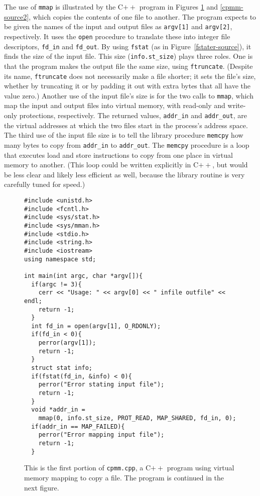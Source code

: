 The use of \verb|mmap| is illustrated by the C$++$ program in
Figures \ref{cpmm-source1} and \ref{cpmm-source2}, which copies the contents of one file to
another.  The program expects to be given the names of the input and
output files as \verb|argv[1]| and \verb|argv[2]|, respectively.  It
uses the \verb|open| procedure to translate these into integer file
descriptors, \verb|fd_in| and \verb|fd_out|.  By using \verb|fstat|
(as in Figure~\ref{fstater-source}), it finds the size of the input
file.  This size (\verb|info.st_size|) plays three roles.  One is that
the program makes the output file the same size, using
\verb|ftruncate|.  (Despite its name,
\verb|ftruncate| does not necessarily make a file shorter; it sets the
file's size, whether by truncating it or by padding it out with extra
bytes that all have the value zero.)  Another use of the input file's size is for the two calls to
\verb|mmap|, which map the input and output files into virtual memory,
with read-only and write-only protections, respectively.  The returned
values, \verb|addr_in| and \verb|addr_out|, are the virtual addresses
at which the two files start in the process's address space.  The
third use of the input file size is to tell the library procedure
\verb|memcpy| how many bytes to copy from \verb|addr_in| to
\verb|addr_out|.  The \verb|memcpy| procedure is a loop
that executes load and store instructions to copy from one place in virtual memory to
another.  (This loop could be written explicitly in C$++$, but would be less
clear and likely less efficient as well, because the library routine is
very carefully tuned for speed.)
\begin{figure}
\begin{verbatim}
#include <unistd.h>
#include <fcntl.h>
#include <sys/stat.h>
#include <sys/mman.h>
#include <stdio.h>
#include <string.h>
#include <iostream>
using namespace std;

int main(int argc, char *argv[]){
  if(argc != 3){
    cerr << "Usage: " << argv[0] << " infile outfile" << endl;
    return -1;
  }
  int fd_in = open(argv[1], O_RDONLY);
  if(fd_in < 0){
    perror(argv[1]);
    return -1;
  }
  struct stat info;
  if(fstat(fd_in, &info) < 0){
    perror("Error stating input file");
    return -1;
  }
  void *addr_in =
    mmap(0, info.st_size, PROT_READ, MAP_SHARED, fd_in, 0);
  if(addr_in == MAP_FAILED){
    perror("Error mapping input file");
    return -1;
  }
\end{verbatim}
\caption{This is the first portion of {\tt cpmm.cpp}, a C$++$ program using virtual
  memory mapping to copy a file. The program is continued in the next figure.}
\label{cpmm-source1}
\end{figure}
